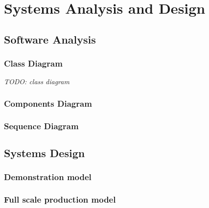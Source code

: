 %
%
\chapter{Systems Analysis and Design}

\section{Software Analysis}

\subsection{Class Diagram}

\textit{TODO: class diagram}

\subsection{Components Diagram}

\subsection{Sequence Diagram}

\section{Systems Design}


\subsection{Demonstration model}

\subsection{Full scale production model}

\clearpage